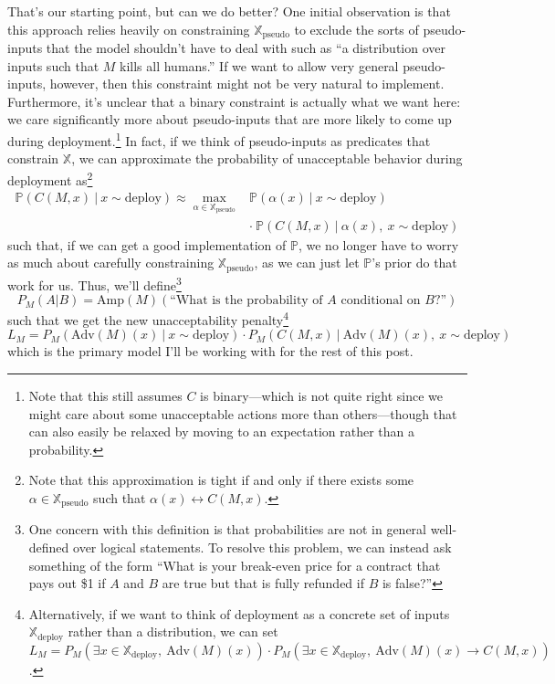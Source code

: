 \documentclass{amsart}
\begin{document}
That's our starting point, but can we do better? One initial observation is that this approach relies heavily on constraining $\mathbb X_\text{pseudo}$ to exclude the sorts of pseudo-inputs that the model shouldn't have to deal with such as ``a distribution over inputs such that $M$ kills all humans.'' If we want to allow very general pseudo-inputs, however, then this constraint might not be very natural to implement. Furthermore, it's unclear that a binary constraint is actually what we want here: we care significantly more about pseudo-inputs that are more likely to come up during deployment.\footnote{Note that this still assumes $C$ is binary---which is not quite right since we might care about some unacceptable actions more than others---though that can also easily be relaxed by moving to an expectation rather than a probability.} In fact, if we think of pseudo-inputs as predicates that constrain $\mathbb X$, we can approximate the probability of unacceptable behavior during deployment as\footnote{Note that this approximation is tight if and only if there exists some $\alpha \in \mathbb X_\text{pseudo}$ such that $\alpha(x) \leftrightarrow C(M, x)$.}
\begin{align*}
    \mathbb P(C(M, x) \ |\ x \sim \text{deploy}) \approx \max_{\alpha \in \mathbb X_\text{pseudo}} & \mathbb P(\alpha(x) \ |\ x \sim \text{deploy}) \\
    & \cdot\ \mathbb P(C(M, x) \ |\ \alpha(x),~ x \sim \text{deploy})
\end{align*}
such that, if we can get a good implementation of $\mathbb P$, we no longer have to worry as much about carefully constraining $\mathbb X_\text{pseudo}$, as we can just let $\mathbb P$'s prior do that work for us. Thus, we'll define\footnote{One concern with this definition is that probabilities are not in general well-defined over logical statements. To resolve this problem, we can instead ask something of the form ``What is your break-even price for a contract that pays out \$1 if $A$ and $B$ are true but that is fully refunded if $B$ is false?''}
\[
    P_M(A|B) = \text{Amp}(M)(\text{``What is the probability of } A \text{ conditional on } B \text{?''})
\]
such that we get the new unacceptability penalty\footnote{Alternatively, if we want to think of deployment as a concrete set of inputs $\mathbb X_\text{deploy}$ rather than a distribution, we can set $L_M = P_M(\exists x \in \mathbb X_\text{deploy},~ \text{Adv}(M)(x)) \cdot P_M(\exists x \in \mathbb X_\text{deploy},~ \text{Adv}(M)(x) \to C(M, x))$.}
\[
    L_M = P_M(\text{Adv}(M)(x) \ |\ x \sim \text{deploy}) \cdot P_M(C(M, x) \ |\ \text{Adv}(M)(x),~ x \sim \text{deploy})
\]
which is the primary model I'll be working with for the rest of this post.
\end{document}
